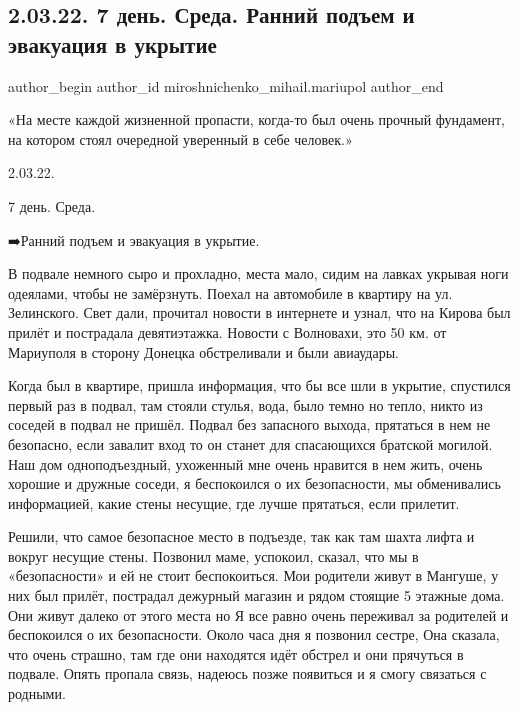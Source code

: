  
 
 
 
 

\subsection{2.03.22. 7 день. Среда. Ранний подъем и эвакуация в укрытие}
\label{sec:02_03_2023.fb.miroshnichenko_mihail.mariupol.1.2_03_22__7_den__sred}

\ifcmt
 author_begin
   author_id miroshnichenko_mihail.mariupol
 author_end
\fi

«На месте каждой жизненной пропасти, когда-то был очень прочный фундамент, на
котором стоял очередной уверенный в себе человек.»

2.03.22.

7 день. Среда.

➡️Ранний подъем и эвакуация в укрытие.

В подвале немного сыро и прохладно, места мало, сидим на лавках укрывая ноги
одеялами, чтобы не замёрзнуть. Поехал на автомобиле в квартиру на ул.
Зелинского. Свет дали, прочитал новости в интернете и узнал, что на Кирова был
прилёт и пострадала девятиэтажка. Новости с Волновахи, это 50 км. от Мариуполя
в сторону Донецка обстреливали и были авиаудары. 

Когда был в квартире, пришла информация, что бы все шли в укрытие, спустился
первый раз в подвал, там стояли стулья, вода,  было темно но тепло, никто из
соседей в подвал не пришёл. Подвал без запасного выхода, прятаться в нем не
безопасно, если завалит вход то он станет для спасающихся братской могилой. Наш
дом одноподъездный, ухоженный мне очень нравится в нем жить, очень хорошие и
дружные соседи, я беспокоился о их безопасности, мы обменивались информацией,
какие стены несущие, где лучше прятаться, если прилетит. 

Решили, что самое безопасное место в подъезде, так как там шахта лифта и вокруг
несущие стены. Позвонил маме, успокоил, сказал, что мы в «безопасности» и ей не
стоит беспокоиться. Мои родители живут в Мангуше, у них был прилёт, пострадал
дежурный магазин и рядом стоящие 5 этажные дома. Они живут далеко от этого
места но Я все равно очень  переживал за родителей и беспокоился о их
безопасности. Около часа дня я позвонил сестре, Она сказала, что очень страшно,
там где они находятся идёт обстрел и они прячуться в подвале. Опять пропала
связь, надеюсь позже появиться и я смогу связаться с родными.

